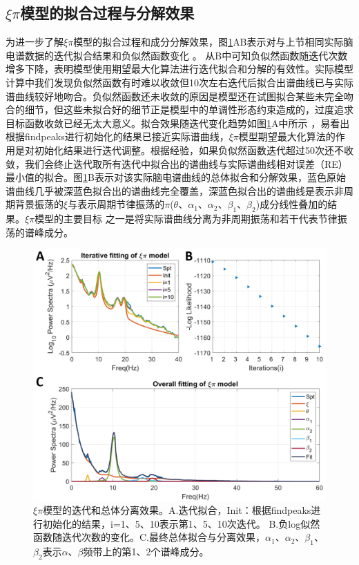 \subsection{$\xi\pi$模型的拟合过程与分解效果}
为进一步了解$\xi\pi$模型的拟合过程和成分分解效果，图\ref{allinone}AB表示对与上节相同实际脑电谱数据的迭代拟合结果和负似然函数变化
。 从B中可知负似然函数随迭代次数增多下降，表明模型使用期望最大化算法进行迭代拟合和分解的有效性。实际模型计算中我们发现负似然函数有时难以收敛但10次左右迭代后拟合出谱曲线已与实际谱曲线较好地吻合。负似然函数还未收敛的原因是模型还在试图拟合某些未完全吻合的细节，但这些未拟合好的细节正是模型中的单调性形态约束造成的，过度追求目标函数收敛已经无太大意义。拟合效果随迭代变化趋势如图\ref{allinone}A中所示
，易看出根据findpeaks进行初始化的结果已接近实际谱曲线，$\xi\pi$模型期望最大化算法的作用是对初始化结果进行迭代调整。根据经验，如果负似然函数迭代超过50次还不收敛，我们会终止迭代取所有迭代中拟合出的谱曲线与实际谱曲线相对误差（RE）最小值的拟合。图\ref{allinone}B表示对该实际脑电谱曲线的总体拟合和分解效果，蓝色原始谱曲线几乎被深蓝色拟合出的谱曲线完全覆盖，深蓝色拟合出的谱曲线是表示非周期背景振荡的$\xi$与表示周期节律振荡的$\pi$($\theta$、$\alpha_1$、$\alpha_2$、$\beta_1$、$\beta_2$)成分线性叠加的结果。$\xi\pi$模型的主要目标
之一是将实际谱曲线分离为非周期振荡和若干代表节律振荡的谱峰成分。
\begin{figure}[!h]
	\includegraphics[width=15cm]{pic/xipi/allinone.png}
	\caption{$\xi\pi$模型的迭代和总体分离效果。A.迭代拟合，Init：根据findpeaks进行初始化的结果，i=1、5、10表示第1、5、10次迭代。 
	B.负log似然函数随迭代次数的变化。C.最终总体拟合与分离效果，$\alpha_1$、$\alpha_2$、$\beta_1$、$\beta_2$表示$\alpha$、$\beta$频带上的第1、2个谱峰成分。}
	\label{allinone}
\end{figure}

